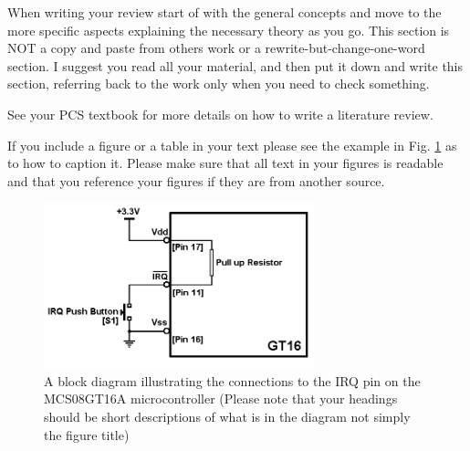 When writing your review start of with the general concepts and move to the more specific aspects
explaining the necessary theory as you go. This section is NOT a copy and paste from others work or a
rewrite-but-change-one-word section. I suggest you read all your material, and then put it down and
write this section, referring back to the work only when you need to check something.

See your PCS textbook for more details on how to write a literature review.

If you include a figure or a table in your text please see the example in Fig. \ref{fig:model} as to how to caption it.
Please make sure that all text in your figures is readable and that you reference your figures if they are
from another source.

\begin{figure}[ht]
\centering
\includegraphics[width=0.7\textwidth]{model.png}
\caption{A block diagram illustrating the connections to the IRQ pin on the MCS08GT16A microcontroller (Please
note that your headings should be short descriptions of what is in the diagram not simply the figure title)}
\label{fig:model}
\end{figure}

